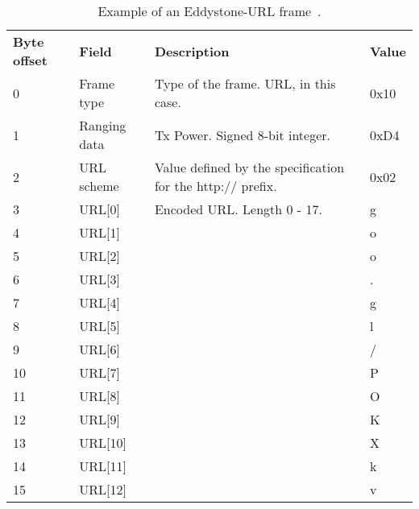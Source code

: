 \begin{table}[h!]
\centering
\caption{Example of an Eddystone-URL frame~\cite{eddystone:protocol-url-spec}.}
\label{tbl:design:ble-positioning:eddystone-url}
\begin{tabular}{llll}
\textbf{Byte offset} & \textbf{Field} & \textbf{Description}                                       & \textbf{Value} \\
0                    & Frame type     & Type of the frame. URL, in this case.                      & 0x10           \\
1                    & Ranging data   & Tx Power. Signed 8-bit integer.                            & 0xD4           \\
2                    & URL scheme     & Value defined by the specification for the http:// prefix. & 0x02           \\
3                    & URL{[}0{]}     & Encoded URL. Length 0 - 17.                                & g              \\
4                    & URL{[}1{]}     &                                                            & o              \\
5                    & URL{[}2{]}     &                                                            & o              \\
6                    & URL{[}3{]}     &                                                            & .              \\
7                    & URL{[}4{]}     &                                                            & g              \\
8                    & URL{[}5{]}     &                                                            & l              \\
9                    & URL{[}6{]}     &                                                            & /              \\
10                   & URL{[}7{]}     &                                                            & P              \\
11                   & URL{[}8{]}     &                                                            & O              \\
12                   & URL{[}9{]}     &                                                            & K              \\
13                   & URL{[}10{]}     &                                                            & X              \\
14                   & URL{[}11{]}     &                                                            & k              \\
15                   & URL{[}12{]}     &                                                            & v
\end{tabular}
\end{table}

